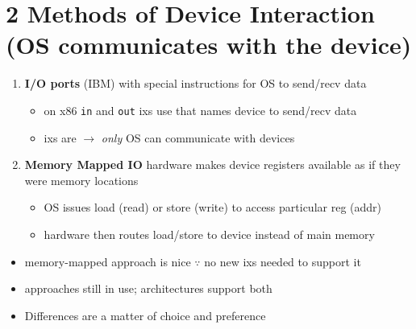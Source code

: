 \section*{2 Methods of Device Interaction (OS communicates with the device)}
\begin{enumerate}
\item \textbf{I/O ports} (IBM) with special instructions for OS to send/recv data
  \begin{itemize}
  \item on x86 \texttt{in} and \texttt{out} ixs use  that names device to send/recv data
  \item ixs are  $\to$ \emph{only} OS can communicate with devices
  \end{itemize}
\item \textbf{Memory Mapped IO}  hardware makes device registers
  available as if they were memory locations
  \begin{itemize}
  \item OS issues load (read) or store (write) to access particular reg (addr)
  \item hardware then routes load/store to device instead of main memory
  \end{itemize}
\end{enumerate}
\begin{itemize}
\item memory-mapped approach is nice $\because$ no new ixs needed to support it
\item {} approaches still in use;  architectures support both
\item Differences are a matter of choice and preference
\end{itemize}
